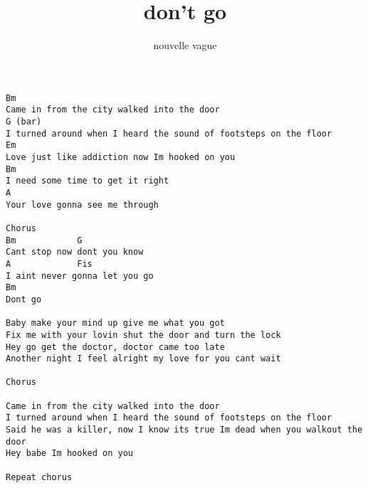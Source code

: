 \author{nouvelle vague}
\title{don't go}
\maketitle
\begin{verbatim}
Bm
Came in from the city walked into the door
G (bar)
I turned around when I heard the sound of footsteps on the floor
Em
Love just like addiction now Im hooked on you
Bm
I need some time to get it right
A
Your love gonna see me through

Chorus
Bm            G
Cant stop now dont you know 
A             Fis
I aint never gonna let you go
Bm
Dont go

Baby make your mind up give me what you got
Fix me with your lovin shut the door and turn the lock
Hey go get the doctor, doctor came too late
Another night I feel alright my love for you cant wait

Chorus

Came in from the city walked into the door
I turned around when I heard the sound of footsteps on the floor
Said he was a killer, now I know its true Im dead when you walkout the door
Hey babe Im hooked on you

Repeat chorus
\end{verbatim}